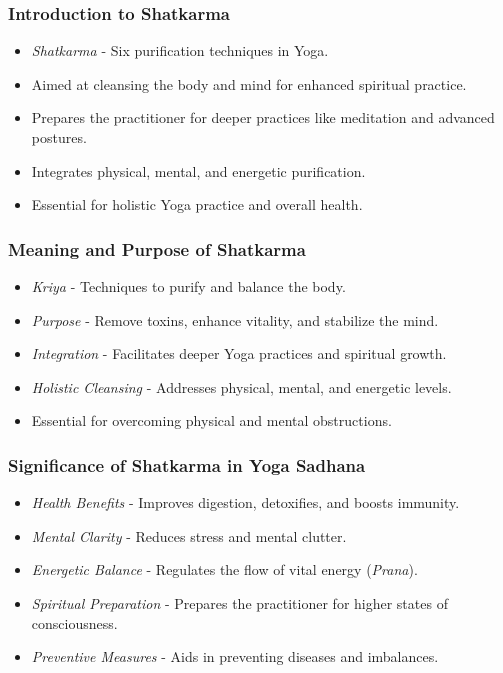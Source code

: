 \begin{frame}[fragile]\frametitle{Introduction to Shatkarma}

      \begin{itemize}
		\item \textit{Shatkarma} - Six purification techniques in Yoga.
		\item Aimed at cleansing the body and mind for enhanced spiritual practice.
		\item Prepares the practitioner for deeper practices like meditation and advanced postures.
		\item Integrates physical, mental, and energetic purification.
		\item Essential for holistic Yoga practice and overall health.
	  \end{itemize}

\end{frame}

\begin{frame}[fragile]\frametitle{Meaning and Purpose of Shatkarma}

      \begin{itemize}
		\item \textit{Kriya} - Techniques to purify and balance the body.
		\item \textit{Purpose} - Remove toxins, enhance vitality, and stabilize the mind.
		\item \textit{Integration} - Facilitates deeper Yoga practices and spiritual growth.
		\item \textit{Holistic Cleansing} - Addresses physical, mental, and energetic levels.
		\item Essential for overcoming physical and mental obstructions.
	  \end{itemize}

\end{frame}

\begin{frame}[fragile]\frametitle{Significance of Shatkarma in Yoga Sadhana}

      \begin{itemize}
		\item \textit{Health Benefits} - Improves digestion, detoxifies, and boosts immunity.
		\item \textit{Mental Clarity} - Reduces stress and mental clutter.
		\item \textit{Energetic Balance} - Regulates the flow of vital energy (\textit{Prana}).
		\item \textit{Spiritual Preparation} - Prepares the practitioner for higher states of consciousness.
		\item \textit{Preventive Measures} - Aids in preventing diseases and imbalances.
	  \end{itemize}

\end{frame}

